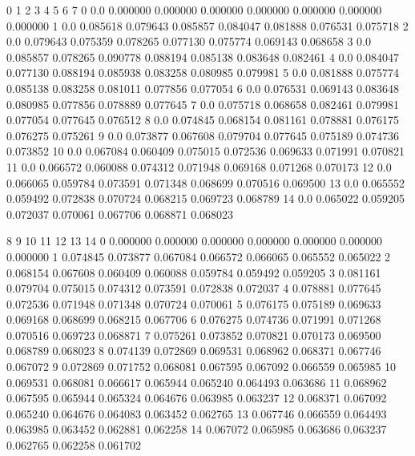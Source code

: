 \documentclass[letterpaper,10pt,english]{sphinxmanual}
\begin{document}
\begin{sphinxVerbatim}[commandchars=\\\{\}]
     0         1         2         3         4         5         6         7   \PYGZbs{}
0   0.0  0.000000  0.000000  0.000000  0.000000  0.000000  0.000000  0.000000   
1   0.0  0.085618  0.079643  0.085857  0.084047  0.081888  0.076531  0.075718   
2   0.0  0.079643  0.075359  0.078265  0.077130  0.075774  0.069143  0.068658   
3   0.0  0.085857  0.078265  0.090778  0.088194  0.085138  0.083648  0.082461   
4   0.0  0.084047  0.077130  0.088194  0.085938  0.083258  0.080985  0.079981   
5   0.0  0.081888  0.075774  0.085138  0.083258  0.081011  0.077856  0.077054   
6   0.0  0.076531  0.069143  0.083648  0.080985  0.077856  0.078889  0.077645   
7   0.0  0.075718  0.068658  0.082461  0.079981  0.077054  0.077645  0.076512   
8   0.0  0.074845  0.068154  0.081161  0.078881  0.076175  0.076275  0.075261   
9   0.0  0.073877  0.067608  0.079704  0.077645  0.075189  0.074736  0.073852   
10  0.0  0.067084  0.060409  0.075015  0.072536  0.069633  0.071991  0.070821   
11  0.0  0.066572  0.060088  0.074312  0.071948  0.069168  0.071268  0.070173   
12  0.0  0.066065  0.059784  0.073591  0.071348  0.068699  0.070516  0.069500   
13  0.0  0.065552  0.059492  0.072838  0.070724  0.068215  0.069723  0.068789   
14  0.0  0.065022  0.059205  0.072037  0.070061  0.067706  0.068871  0.068023   

          8         9         10        11        12        13        14  
0   0.000000  0.000000  0.000000  0.000000  0.000000  0.000000  0.000000  
1   0.074845  0.073877  0.067084  0.066572  0.066065  0.065552  0.065022  
2   0.068154  0.067608  0.060409  0.060088  0.059784  0.059492  0.059205  
3   0.081161  0.079704  0.075015  0.074312  0.073591  0.072838  0.072037  
4   0.078881  0.077645  0.072536  0.071948  0.071348  0.070724  0.070061  
5   0.076175  0.075189  0.069633  0.069168  0.068699  0.068215  0.067706  
6   0.076275  0.074736  0.071991  0.071268  0.070516  0.069723  0.068871  
7   0.075261  0.073852  0.070821  0.070173  0.069500  0.068789  0.068023  
8   0.074139  0.072869  0.069531  0.068962  0.068371  0.067746  0.067072  
9   0.072869  0.071752  0.068081  0.067595  0.067092  0.066559  0.065985  
10  0.069531  0.068081  0.066617  0.065944  0.065240  0.064493  0.063686  
11  0.068962  0.067595  0.065944  0.065324  0.064676  0.063985  0.063237  
12  0.068371  0.067092  0.065240  0.064676  0.064083  0.063452  0.062765  
13  0.067746  0.066559  0.064493  0.063985  0.063452  0.062881  0.062258  
14  0.067072  0.065985  0.063686  0.063237  0.062765  0.062258  0.061702  
\end{sphinxVerbatim}
\end{document}
